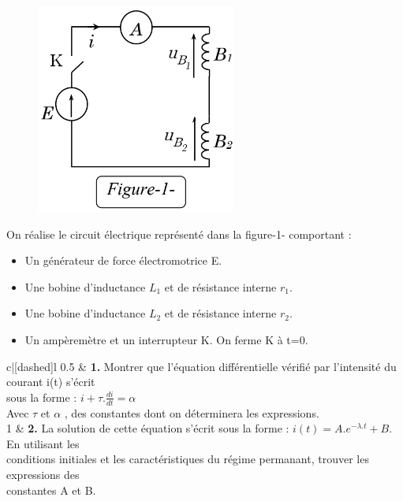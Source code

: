 \documentclass[12pt]{article}
\begin{document}
\begin{figure}
	\vspace{-1cm}
\includegraphics[width=0.9\linewidth]{./img/phys00.png} 
\end{figure}

On réalise le circuit électrique représenté dans
la figure-1- comportant :
\begin{itemize}
	\item Un générateur de force électromotrice E.
	\item Une bobine d’inductance $L_1$ et de résistance
interne $r_1$.
\item Une bobine d’inductance $L_2$ et de résistance
interne $r_2$.
\item Un ampèremètre et un interrupteur K.
On ferme K à t=0.
\end{itemize}

\begin{tblr}{c|[dashed]l}
	0.5  & {\textbf{1. }Montrer que l’équation différentielle vérifié par l’intensité du courant i(t)
	s’écrit \\sous la forme : $i + \tau.\frac{di}{dt} = \alpha$ \\
	Avec $\tau$ et $\alpha$ , des constantes dont on déterminera les expressions.
	}\\
	
	1 & {\textbf{2. }La solution de cette équation s’écrit sous la forme : $i(t) =A.e^{-\lambda.t} + B$. En
utilisant les \\conditions initiales et les caractéristiques du régime permanant,
trouver les expressions des \\constantes A et B.  } \\
	\end{tblr}
\end{document}
